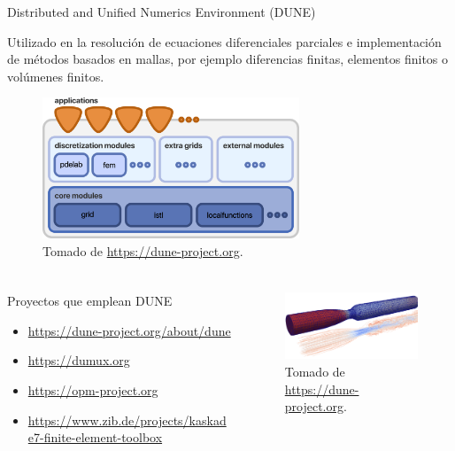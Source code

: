 \begin{frame}
\begin{alertblock}{Distributed and Unified Numerics Environment (DUNE)}
\begin{itemize}
			      Utilizado en la resolución de ecuaciones diferenciales parciales e implementación de métodos basados en mallas, por ejemplo diferencias finitas, elementos finitos o volúmenes finitos.
		\end{itemize}
	\end{alertblock}

	\begin{figure}[ht!]
		\centering
		\includegraphics[height=4.2cm]{dunedesign}
		\caption{Tomado de \url{https://dune-project.org}.}
	\end{figure}

\end{frame}

\begin{frame}
	\frametitle{\secname}
	\framesubtitle{\subsecname}

	\begin{columns}
		\begin{column}{0.5\textwidth}
			\begin{alertblock}{Proyectos que emplean DUNE}
				\begin{itemize}
					\item \url{https://dune-project.org/about/dune}
					\item \url{https://dumux.org}
					\item \url{https://opm-project.org}
					\item \url{https://www.zib.de/projects/kaskade7-finite-element-toolbox}
				\end{itemize}
			\end{alertblock}
		\end{column}

		\begin{column}{0.5\textwidth}
			\begin{figure}[ht!]
				\centering
				\includegraphics[width=7.5cm]{blood_girke}
				\caption{Tomado de \url{https://dune-project.org}.}
			\end{figure}
		\end{column}
	\end{columns}
\end{frame}

